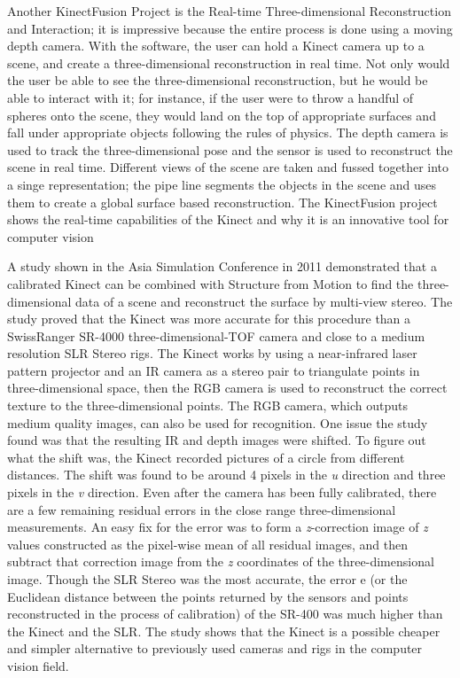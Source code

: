 \documentclass[pdftex,10.5pt]{report}
\begin{document}
Another KinectFusion Project is the Real-time Three-dimensional Reconstruction and Interaction; it is impressive because the entire process is done using a moving depth camera. With the software, the user can hold a Kinect camera up to a scene, and create a three-dimensional reconstruction in real time. Not only would the user be able to see the three-dimensional reconstruction, but he would be able to interact with it; for instance, if the user were to throw a handful of spheres onto the scene, they would land on the top of appropriate surfaces and fall under appropriate objects following the rules of physics. The depth camera is used to track the three-dimensional pose and the sensor is used to reconstruct the scene in real time. Different views of the scene are taken and fussed together into a singe representation; the pipe line segments the objects in the scene and uses them to create a global surface based reconstruction. The KinectFusion project shows the real-time capabilities of the Kinect and why it is an innovative tool for computer vision

A study shown in the Asia Simulation Conference in 2011 demonstrated that a calibrated Kinect can be combined with Structure from Motion to find the three-dimensional data of a scene and reconstruct the surface by multi-view stereo. The study proved that the Kinect was more accurate for this procedure than a SwissRanger SR-4000 three-dimensional-TOF camera and close to a medium resolution SLR Stereo rigs. The Kinect works by using a near-infrared laser pattern projector and an IR camera as a stereo pair to triangulate points in three-dimensional space, then the RGB camera is used to reconstruct the correct texture to the three-dimensional points. The RGB camera, which outputs medium quality images, can also be used for recognition. One issue the study found was that the resulting IR and depth images were shifted. To figure out what the shift was, the Kinect recorded pictures of a circle from different distances. The shift was found to be around 4 pixels in the \emph{u} direction and three pixels in the \emph{v} direction. Even after the camera has been fully calibrated, there are a few remaining residual errors in the close range three-dimensional measurements. An easy fix for the error was to form a \emph{z}-correction image of \emph{z} values constructed as the pixel-wise mean of all residual images, and then subtract that correction image from the \emph{z} coordinates of the three-dimensional image.\cite{cite1} Though the SLR Stereo was the most accurate, the error e (or the Euclidean distance between the points returned by the sensors and points reconstructed in the process of calibration) of the SR-400 was much higher than the Kinect and the SLR. The study shows that the Kinect is a possible cheaper and simpler alternative to previously used cameras and rigs in the computer vision field.
\end{document}
